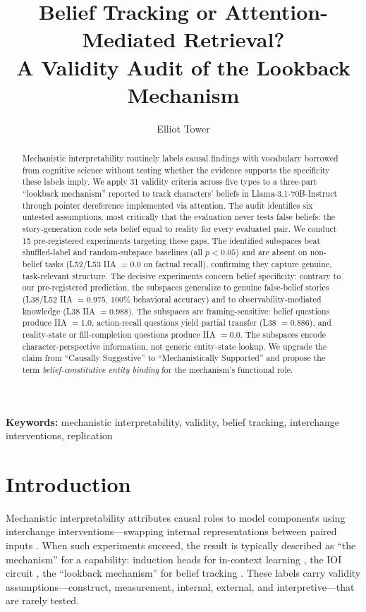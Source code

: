 \documentclass[11pt]{article}
\title{Belief Tracking or Attention-Mediated Retrieval?\\A Validity Audit of the Lookback Mechanism}
\author{Elliot Tower}
\affil{Independent Researcher \\ \texttt{elliot@elliottower.ai}}
\begin{document}
\linenumbers
\maketitle

\begin{abstract}
Mechanistic interpretability routinely labels causal findings with vocabulary borrowed from cognitive science without testing whether the evidence supports the specificity these labels imply. We apply 31 validity criteria across five types to a three-part ``lookback mechanism'' reported to track characters' beliefs in Llama-3.1-70B-Instruct through pointer dereference implemented via attention. The audit identifies six untested assumptions, most critically that the evaluation never tests false beliefs: the story-generation code sets belief equal to reality for every evaluated pair. We conduct 15 pre-registered experiments targeting these gaps. The identified subspaces beat shuffled-label and random-subspace baselines (all $p < 0.05$) and are absent on non-belief tasks (L52/L53 IIA $= 0.0$ on factual recall), confirming they capture genuine, task-relevant structure. The decisive experiments concern belief specificity: contrary to our pre-registered prediction, the subspaces generalize to genuine false-belief stories (L38/L52 IIA $= 0.975$, 100\% behavioral accuracy) and to observability-mediated knowledge (L38 IIA $= 0.988$). The subspaces are framing-sensitive: belief questions produce IIA $= 1.0$, action-recall questions yield partial transfer (L38 $= 0.886$), and reality-state or fill-completion questions produce IIA $= 0.0$. The subspaces encode character-perspective information, not generic entity-state lookup. We upgrade the claim from ``Causally Suggestive'' to ``Mechanistically Supported'' and propose the term \emph{belief-constitutive entity binding} for the mechanism's functional role.
\end{abstract}

\noindent\textbf{Keywords:} mechanistic interpretability, validity, belief tracking, interchange interventions, replication


\section{Introduction}
\label{sec:intro}

Mechanistic interpretability attributes causal roles to model components using interchange interventions---swapping internal representations between paired inputs \citep{geiger2021causal, vig2020investigating}. When such experiments succeed, the result is typically described as ``the mechanism'' for a capability: induction heads for in-context learning \citep{olsson2022context}, the IOI circuit \citep{wang2023interpretability}, the ``lookback mechanism'' for belief tracking \citep{prakash2025lookback}. These labels carry validity assumptions---construct, measurement, internal, external, and interpretive---that are rarely tested.
\end{document}
